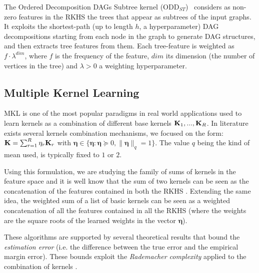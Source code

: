 \documentclass{esannV2}
\newcommand{\KK}{{\bf K}}
\newcommand{\1}{{\bf 1}}
\newcommand{\eeta}{\pmb{\eta}}
\begin{document}
The Ordered Decomposition DAGs Subtree kernel (ODD$_{ST}$)~\cite{DaSanMartino2016} considers as non-zero features in the RKHS the trees that appear as subtrees of the input graphs.
It exploits the shortest-path (up to length $h$, a hyperparameter) DAG decompositions starting from each node in the graph to generate DAG structures, and then extracts tree features from them.
Each tree-feature is weighted as $f \cdot \lambda^{dim}$, where $f$ is the frequency of the feature, $dim$ its dimension (the number of vertices in the tree) and $\lambda>0$ a weighting hyperparameter.

\subsection{Multiple Kernel Learning}
\label{MKL}
MKL \cite{Gonen2011} is one of the most popular paradigms in real world applications \cite{Bucak2014} used to learn kernels as a combination of different base kernels $\KK_1,...,\KK_R$. %
In literature exists several kernels combination mechanisms, we focused on the form:
$ \KK = \sum_{r=1}^R \eta_r \KK_r$ with $\eeta \in \{ \eeta : \eeta \succcurlyeq 0, \| \eeta \|_q = 1 \}$. The value $q$ being the kind of mean used, is typically fixed to $1$ or $2$.

Using this formulation, we are studying the family of sums of kernels in the feature space and it is well know that the sum of two kernels can be seen as the concatenation of the features contained in both the RKHS \cite{Shawe-Taylor2004}. Extending the same idea, the weighted sum of a list of basic kernels can be seen as a weighted concatenation of all the features contained in all the RKHS (where the weights are the square roots of the learned weights in the vector $\eeta$).

%
These algorithms are supported by several theoretical results that bound the \emph{estimation error} (i.e. the difference between the true error and the empirical margin error). These bounds exploit the \emph{Rademacher complexity} applied to the combination of kernels \cite{Maurer2012,Cortes2009c}.%
\end{document}
